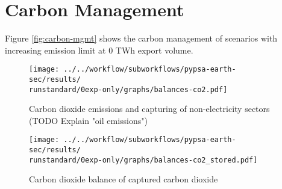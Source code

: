 \section{Carbon Management}
\label{subsec:carbon_mgmt}

Figure \ref{fig:carbon-mgmt} shows the carbon management of scenarios with increasing emission limit at 0 TWh export volume.


\begin{figure*}[h!] %
    \centering
    \begin{subfigure}[b]{0.49\linewidth}
        \centering
        \texttt{[image: ../../workflow/subworkflows/pypsa-earth-sec/results/\\runstandard/0exp-only/graphs/balances-co2.pdf]}
        \caption{Carbon dioxide emissions and capturing of non-electricity sectors (TODO Explain "oil emissions")}
        \label{fig:carbon-atmo}
    \end{subfigure}
    \hfill
    \begin{subfigure}[b]{0.49\linewidth}
        \centering
        \texttt{[image: ../../workflow/subworkflows/pypsa-earth-sec/results/\\runstandard/0exp-only/graphs/balances-co2\_stored.pdf]}
        \caption{Carbon dioxide balance of captured carbon dioxide}
        \label{fig:carbon-store}
    \end{subfigure}
    \hfill
    \caption{Carbon dioxide \ref{fig:carbon-atmo} emissions and capturing as well as \ref{fig:carbon-store} management of captured carbon dioxide}
    \label{fig:carbon-mgmt}
\end{figure*}


\clearpage